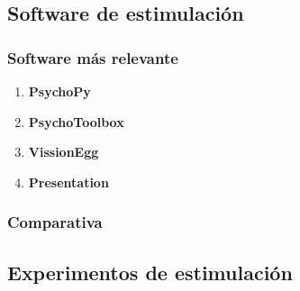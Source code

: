 \documentclass[../main.tex]{subfiles}
\begin{document}
	\subsection{Software de estimulación}
	\label{sub:02_software_de_estimulación}
		\subsubsection{Software más relevante}
		\label{ssub:02_software_más_relevante}
			\begin{enumerate}
				\item \textbf{PsychoPy}

				\item \textbf{PsychoToolbox}

				\item \textbf{VissionEgg}

				\item \textbf{Presentation}

			\end{enumerate}

		\subsubsection{Comparativa}
		\label{ssub:02_comparativa_software}

	\subsection{Experimentos de estimulación}
	\label{sub:02_experimentos_de_estimulación}
\end{document}
